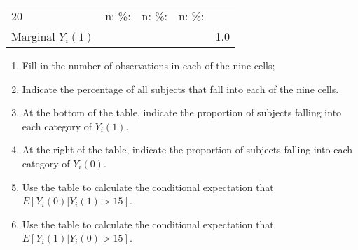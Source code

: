 \documentclass[]{article}
\providecommand{\tightlist}{%
  \setlength{\itemsep}{0pt}\setlength{\parskip}{0pt}}
\begin{document}
\begin{longtable}[]{@{}lllll@{}}
\begin{minipage}[t]{0.19\columnwidth}\raggedright\strut
20\strut
\end{minipage} & \begin{minipage}[t]{0.06\columnwidth}\raggedright\strut
n: \%:\strut
\end{minipage} & \begin{minipage}[t]{0.06\columnwidth}\raggedright\strut
n: \%:\strut
\end{minipage} & \begin{minipage}[t]{0.06\columnwidth}\raggedright\strut
n: \%:\strut
\end{minipage} & \begin{minipage}[t]{0.32\columnwidth}\raggedright\strut
\strut
\end{minipage}\tabularnewline
\begin{minipage}[t]{0.19\columnwidth}\raggedright\strut
Marginal \(Y_{i}(1)\)\strut
\end{minipage} & \begin{minipage}[t]{0.06\columnwidth}\raggedright\strut
\strut
\end{minipage} & \begin{minipage}[t]{0.06\columnwidth}\raggedright\strut
\strut
\end{minipage} & \begin{minipage}[t]{0.06\columnwidth}\raggedright\strut
\strut
\end{minipage} & \begin{minipage}[t]{0.32\columnwidth}\raggedright\strut
1.0\strut
\end{minipage}\tabularnewline
\bottomrule
\end{longtable}

\begin{enumerate}
\def\labelenumi{\alph{enumi}.}
\tightlist
\item
  Fill in the number of observations in each of the nine cells;
\item
  Indicate the percentage of all subjects that fall into each of the
  nine cells.
\item
  At the bottom of the table, indicate the proportion of subjects
  falling into each category of \(Y_{i}(1)\).
\item
  At the right of the table, indicate the proportion of subjects falling
  into each category of \(Y_{i}(0)\).
\item
  Use the table to calculate the conditional expectation that
  \(E[Y_{i}(0)|Y_{i}(1) > 15]\).
\item
  Use the table to calculate the conditional expectation that
  \(E[Y_{i}(1)|Y_{i}(0) > 15]\).
\end{enumerate}
\end{document}
